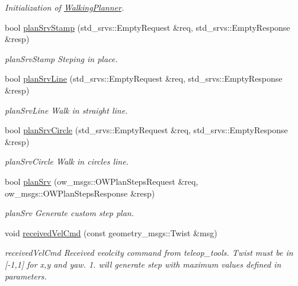 \begin{DoxyCompactItemize}
\begin{DoxyCompactList}\small\item\em Initialization of \hyperlink{classow__planner_1_1WalkingPlanner}{Walking\+Planner}. \end{DoxyCompactList}\item 
bool \hyperlink{classow__planner_1_1WalkingPlanner_abfbcb01a92c739e5970aee04fcb48b96}{plan\+Srv\+Stamp} (std\+\_\+srvs\+::\+Empty\+Request \&req, std\+\_\+srvs\+::\+Empty\+Response \&resp)
\begin{DoxyCompactList}\small\item\em plan\+Srv\+Stamp Steping in place. \end{DoxyCompactList}\item 
bool \hyperlink{classow__planner_1_1WalkingPlanner_a12fd257292f750eb8dd69829bac7e586}{plan\+Srv\+Line} (std\+\_\+srvs\+::\+Empty\+Request \&req, std\+\_\+srvs\+::\+Empty\+Response \&resp)
\begin{DoxyCompactList}\small\item\em plan\+Srv\+Line Walk in straight line. \end{DoxyCompactList}\item 
bool \hyperlink{classow__planner_1_1WalkingPlanner_a0c75042ec782b3bd9bb2e07079bf4e1f}{plan\+Srv\+Circle} (std\+\_\+srvs\+::\+Empty\+Request \&req, std\+\_\+srvs\+::\+Empty\+Response \&resp)
\begin{DoxyCompactList}\small\item\em plan\+Srv\+Circle Walk in circles line. \end{DoxyCompactList}\item 
bool \hyperlink{classow__planner_1_1WalkingPlanner_a3ffca8275cf926de83bc0198cc0ebfe1}{plan\+Srv} (ow\+\_\+msgs\+::\+O\+W\+Plan\+Steps\+Request \&req, ow\+\_\+msgs\+::\+O\+W\+Plan\+Steps\+Response \&resp)
\begin{DoxyCompactList}\small\item\em plan\+Srv Generate custom step plan. \end{DoxyCompactList}\item 
void \hyperlink{classow__planner_1_1WalkingPlanner_ae57126baf08815524e5b28786c56397b}{received\+Vel\+Cmd} (const geometry\+\_\+msgs\+::\+Twist \&msg)
\begin{DoxyCompactList}\small\item\em received\+Vel\+Cmd Received veolcity command from teleop\+\_\+tools. Twist must be in \mbox{[}-\/1,1\mbox{]} for x,y and yaw. 1. will generate step with maximum values defined in parameters. \end{DoxyCompactList}\item 

\end{DoxyCompactItemize}
